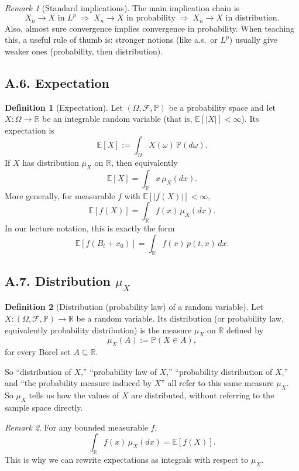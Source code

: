 \documentclass[11pt]{article}
\theoremstyle{definition}
\newtheorem{definition}{Definition}
\theoremstyle{remark}
\newtheorem{remark}{Remark}
\begin{document}
\begin{remark}[Standard implications]
The main implication chain is
\[
X_n\to X\text{ in }L^p
\;\Longrightarrow\;
X_n\to X\text{ in probability}
\;\Longrightarrow\;
X_n\to X\text{ in distribution}.
\]
Also, almost sure convergence implies convergence in probability.
When teaching this, a useful rule of thumb is: stronger notions (like a.s.\ or $L^p$) usually give weaker ones (probability, then distribution).
\end{remark}

\subsection*{A.6. Expectation}
\begin{definition}[Expectation]
Let $(\Omega,\mathcal F,\mathbb P)$ be a probability space and let $X:\Omega\to\mathbb R$ be an integrable random variable (that is, $\mathbb E[|X|]<\infty$). Its expectation is
\[
\mathbb E[X]:=\int_{\Omega} X(\omega)\,\mathbb P(d\omega).
\]
If $X$ has distribution $\mu_X$ on $\mathbb R$, then equivalently
\[
\mathbb E[X]=\int_{\mathbb R} x\,\mu_X(dx).
\]
More generally, for measurable $f$ with $\mathbb E[|f(X)|]<\infty$,
\[
\mathbb E[f(X)]=\int_{\mathbb R} f(x)\,\mu_X(dx).
\]
In our lecture notation, this is exactly the form
\[
\mathbb E[f(B_t+x_0)]=\int_{\mathbb R} f(x)\,p(t,x)\,dx.
\]
\end{definition}

\subsection*{A.7. Distribution $\mu_X$}
\begin{definition}[Distribution (probability law) of a random variable]
Let $X:(\Omega,\mathcal F,\mathbb P)\to\mathbb R$ be a random variable. Its distribution (or probability law, equivalently probability distribution) is the measure $\mu_X$ on $\mathbb R$ defined by
\[
\mu_X(A):=\mathbb P(X\in A),
\]
for every Borel set $A\subseteq\mathbb R$.

So ``distribution of $X$,'' ``probability law of $X$,'' ``probability distribution of $X$,'' and ``the probability measure induced by $X$'' all refer to this same measure $\mu_X$.
So $\mu_X$ tells us how the values of $X$ are distributed, without referring to the sample space directly.
\end{definition}

\begin{remark}
For any bounded measurable $f$,
\[
\int_{\mathbb R} f(x)\,\mu_X(dx)=\mathbb E[f(X)].
\]
This is why we can rewrite expectations as integrals with respect to $\mu_X$.
\end{remark}
\end{document}

